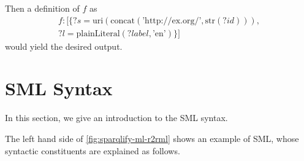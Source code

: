 Then a definition of $f$ as
\begin{multline}
f: [\{ ?s = \text{uri}(\text{concat}(\text{'http://ex.org/'}, \text{str}(?id))), \\
      ?l = \text{plainLiteral}(?label, \text{'en'})
\}]
\end{multline}
would yield the desired output.


\section{SML Syntax}
\label{sec:syntax}

In this section, we give an introduction to the SML syntax.

The left hand side of \autoref{fig:sparqlify-ml-r2rml} shows an example of SML,
whose syntactic constituents are explained as follows.


%

